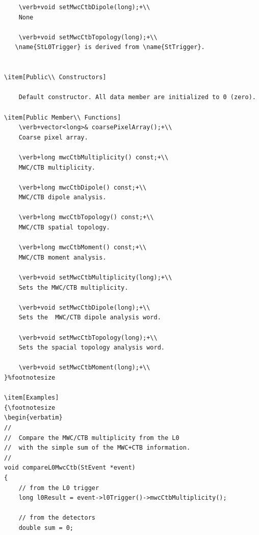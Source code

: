 \begin{enumerate}
\begin{Entry}
{\begin{verbatim}
    \verb+void setMwcCtbDipole(long);+\\           
    None
    
    \verb+void setMwcCtbTopology(long);+\\           
   \name{StL0Trigger} is derived from \name{StTrigger}.
    

\item[Public\\ Constructors]
    
    Default constructor. All data member are initialized to 0 (zero).

\item[Public Member\\ Functions]
    \verb+vector<long>& coarsePixelArray();+\\
    Coarse pixel array.

    \verb+long mwcCtbMultiplicity() const;+\\
    MWC/CTB multiplicity.

    \verb+long mwcCtbDipole() const;+\\
    MWC/CTB dipole analysis.

    \verb+long mwcCtbTopology() const;+\\
    MWC/CTB spatial topology.

    \verb+long mwcCtbMoment() const;+\\
    MWC/CTB moment analysis.

    \verb+void setMwcCtbMultiplicity(long);+\\
    Sets the MWC/CTB multiplicity.

    \verb+void setMwcCtbDipole(long);+\\
    Sets the  MWC/CTB dipole analysis word.

    \verb+void setMwcCtbTopology(long);+\\
    Sets the spacial topology analysis word.

    \verb+void setMwcCtbMoment(long);+\\
}%footnotesize    

\item[Examples]
{\footnotesize
\begin{verbatim}
//
//  Compare the MWC/CTB multiplicity from the L0
//  with the simple sum of the MWC+CTB information.
//
void compareL0MwcCtb(StEvent *event)
{
    // from the L0 trigger
    long l0Result = event->l0Trigger()->mwcCtbMultiplicity();

    // from the detectors
    double sum = 0;
    

\end{verbatim}}
\end{Entry}
\end{enumerate}
